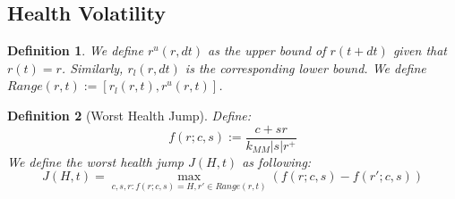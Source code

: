 \documentclass[notitlepage,reqno,11pt]{amsart}
\numberwithin{equation}{section}
\newtheorem{definition}{Definition}[section]
\newtheorem{remark}{Remark}[section]
\begin{document}


\subsection{Health Volatility}\label{H-volatility}
\begin{definition}
    We define $r^u(r, dt)$ as the upper bound of $r(t+dt)$ given that $r(t) = r$. Similarly, $r_l(r, dt)$ is the corresponding lower bound. We define $Range(r,t) := [r_l(r,t), r^u(r,t)]$. 
\end{definition}

\begin{definition}[Worst Health Jump]
    Define:
        $$
        f(r;c,s) := \frac{c + sr}{k_{MM}|s|r^+}
        $$
    We define the worst health jump $J(H,t)$ as following:
    \begin{equation}
        J(H,t) = \max_{c,s,r: f(r;c,s) = H, r'\in Range(r,t)} \left(f(r;c,s) - f(r';c,s) \right)
    \end{equation}
\end{definition}
\end{document}
